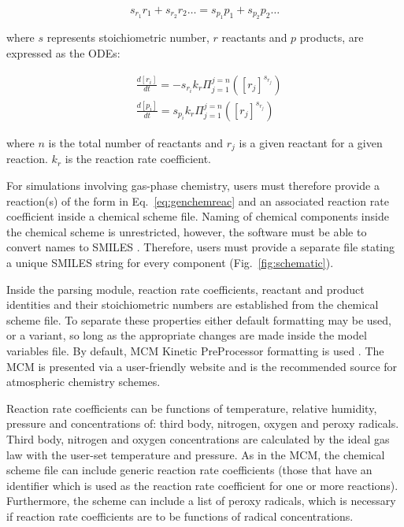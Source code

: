 \documentclass[gmd, manuscript]{copernicus}
\begin{document}
\begin{equation} \label{eq:genchemreac}
s_{r_{1}}r_{1}+s_{r_{2}}r_{2} \ldots=s_{p_{1}}p_{1}+s_{p_{2}}p_{2}\ldots
\end{equation}

where $s$ represents stoichiometric number, $r$ reactants and $p$ products, are expressed as the ODEs:

\begin{align} \label{eq:genchemode}
	&\frac{d[r_{i}]}{dt} = -s_{r_{i}}k_r\Pi_{j=1}^{j=n}\left([r_j]^{s_{r_{j}}}\right)\\
	&\frac{d[p_{i}]}{dt} = s_{p_{i}}k_r\Pi_{j=1}^{j=n}\left([r_j]^{s_{r_{j}}}\right) 
\end{align}

where $n$ is the total number of reactants and $r_{j}$ is a given reactant for a given reaction.  $k_r$ is the reaction rate coefficient.

For simulations involving gas-phase chemistry, users must therefore provide a reaction(s) of the form in Eq.~\ref{eq:genchemreac} and an associated reaction rate coefficient inside a chemical scheme file.  Naming of chemical components inside the chemical scheme is unrestricted, however, the software must be able to convert names to SMILES \citep{Weininger1988}.  Therefore, users must provide a separate file stating a unique SMILES string for every component (Fig.~\ref{fig:schematic}).

Inside the parsing module, reaction rate coefficients, reactant and product identities and their stoichiometric numbers are established from the chemical scheme file.  To separate these properties either default formatting may be used, or a variant, so long as the appropriate changes are made inside the model variables file.  By default, MCM Kinetic PreProcessor \citep{Sander2006} formatting is used \citep{Jenkin1997, Saunders2003}.  The MCM is presented via a user-friendly website \citep{MCM2020} and is the recommended source for atmospheric chemistry schemes.

Reaction rate coefficients can be functions of temperature, relative humidity, pressure and concentrations of: third body, nitrogen, oxygen and peroxy radicals.  Third body, nitrogen and oxygen concentrations are calculated by the ideal gas law with the user-set temperature and pressure.  As in the MCM, the chemical scheme file can include generic reaction rate coefficients (those that have an identifier which is used as the reaction rate coefficient for one or more reactions).  Furthermore, the scheme can include a list of peroxy radicals, which is necessary if reaction rate coefficients are to be functions of radical concentrations.
\end{document}
